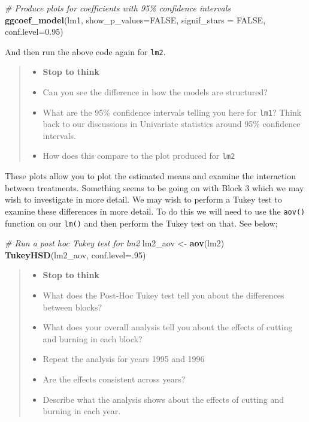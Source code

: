 \documentclass[
]{book}
\newenvironment{Shaded}{\begin{snugshade}}{\end{snugshade}}
\newcommand{\AttributeTok}[1]{\textcolor[rgb]{0.13,0.29,0.53}{#1}}
\newcommand{\CommentTok}[1]{\textcolor[rgb]{0.56,0.35,0.01}{\textit{#1}}}
\newcommand{\ConstantTok}[1]{\textcolor[rgb]{0.56,0.35,0.01}{#1}}
\newcommand{\DecValTok}[1]{\textcolor[rgb]{0.00,0.00,0.81}{#1}}
\newcommand{\FloatTok}[1]{\textcolor[rgb]{0.00,0.00,0.81}{#1}}
\newcommand{\FunctionTok}[1]{\textcolor[rgb]{0.13,0.29,0.53}{\textbf{#1}}}
\newcommand{\NormalTok}[1]{#1}
\newcommand{\OtherTok}[1]{\textcolor[rgb]{0.56,0.35,0.01}{#1}}
\providecommand{\tightlist}{%
  \setlength{\itemsep}{0pt}\setlength{\parskip}{0pt}}
\begin{document}
\begin{Shaded}
\begin{Highlighting}[]
\CommentTok{\# Produce plots for coefficients with 95\% confidence intervals}
\FunctionTok{ggcoef\_model}\NormalTok{(lm1,}
             \AttributeTok{show\_p\_values=}\ConstantTok{FALSE}\NormalTok{,}
             \AttributeTok{signif\_stars =} \ConstantTok{FALSE}\NormalTok{,}
             \AttributeTok{conf.level=}\FloatTok{0.95}\NormalTok{)}
\end{Highlighting}
\end{Shaded}

And then run the above code again for \texttt{lm2}.

\begin{quote}
\begin{itemize}
\tightlist
\item
  \textbf{Stop to think}
\item
  Can you see the difference in how the models are structured?
\item
  What are the 95\% confidence intervals telling you here for \texttt{lm1}? Think back to our discussions in Univariate statistics around 95\% confidence intervals.
\item
  How does this compare to the plot produced for \texttt{lm2}
\end{itemize}
\end{quote}

These plots allow you to plot the estimated means and examine the interaction between treatments. Something seems to be going on with Block 3 which we may wish to investigate in more detail. We may wish to perform a Tukey test to examine these differences in more detail. To do this we will need to use the \texttt{aov()} function on our \texttt{lm()} and then perform the Tukey test on that. See below;

\begin{Shaded}
\begin{Highlighting}[]
\CommentTok{\# Run a post hoc Tukey test for lm2}
\NormalTok{lm2\_aov }\OtherTok{\textless{}{-}} \FunctionTok{aov}\NormalTok{(lm2)}
\FunctionTok{TukeyHSD}\NormalTok{(lm2\_aov, }\AttributeTok{conf.level=}\NormalTok{.}\DecValTok{95}\NormalTok{)}
\end{Highlighting}
\end{Shaded}

\begin{quote}
\begin{itemize}
\tightlist
\item
  \textbf{Stop to think}
\item
  What does the Post-Hoc Tukey test tell you about the differences between blocks?
\item
  What does your overall analysis tell you about the effects of cutting and burning in each block?
\item
  Repeat the analysis for years 1995 and 1996
\item
  Are the effects consistent across years?
\item
  Describe what the analysis shows about the effects of cutting and burning in each year.
\end{itemize}
\end{quote}
\end{document}
